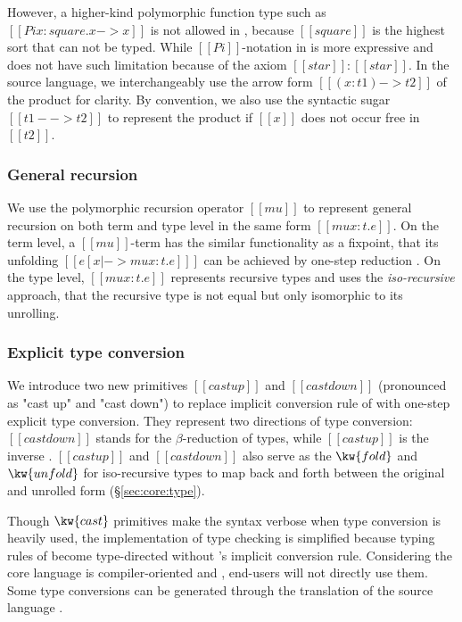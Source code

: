 However, a higher-kind polymorphic function type such as $[[Pi x:square.x->x]]$ is not allowed in \cc, because $[[square]]$ is the highest sort that can not be typed. While $[[Pi]]$-notation in \name is more expressive and does not have such limitation because of the axiom $[[star]]:[[star]]$. In the source language, we interchangeably use the arrow form $[[(x:t1)->t2]]$ of the product for clarity. By convention, we also use the syntactic sugar $[[t1 --> t2]]$ to represent the product if $[[x]]$ does not occur free in $[[t2]]$.

\subsubsection{General recursion}
We use the polymorphic recursion operator $[[mu]]$ to represent general recursion on both term and type level in the same form $[[mu x:t.e]]$. On the term level, a $[[mu]]$-term has the similar functionality as a fixpoint, that its unfolding $[[e [x |-> mu x:t.e] ]]$ can be achieved by one-step reduction . On the type level, $[[mu x:t.e]]$ represents recursive types and uses the \emph{iso-recursive} approach, that the recursive type is not equal but only isomorphic to its unrolling.

\subsubsection{Explicit type conversion}
We introduce two new primitives $[[castup]]$ and $[[castdown]]$ (pronounced as "cast up" and "cast down") to replace implicit conversion rule of \cc with one-step explicit type conversion. They represent two directions of type conversion: $[[castdown]]$ stands for the $\beta$-reduction of types, while $[[castup]]$ is the inverse . $[[castup]]$ and $[[castdown]]$ also serve as the $\kw{fold}$ and $\kw{unfold}$ for iso-recursive types to map back and forth between the original and unrolled form (\S \ref{sec:core:type}).

Though $\kw{cast}$ primitives make the syntax verbose when type conversion is heavily used, the implementation of type checking is simplified because typing rules of \name become type-directed without \cc's implicit conversion rule. Considering the core language is compiler-oriented and , end-users will not directly use them. Some type conversions can be generated through the translation of the source language \fixme{(\S \ref{sec:src})}.


